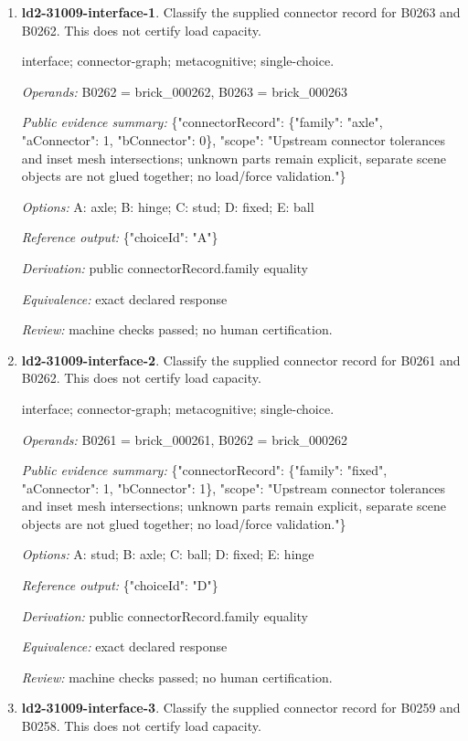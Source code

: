 \begin{enumerate}
\item \textbf{ld2-31009-interface-1}. Classify the supplied connector record for B0263 and B0262. This does not certify load capacity.
\par{\small interface; connector-graph; metacognitive; single-choice.\par\textit{Operands:} B0262 = brick\_000262, B0263 = brick\_000263\par\textit{Public evidence summary:} \{"connectorRecord": \{"family": "axle", "aConnector": 1, "bConnector": 0\}, "scope": "Upstream connector tolerances and inset mesh intersections; unknown parts remain explicit, separate scene objects are not glued together; no load/force validation."\}\par\textit{Options:} A: axle; B: hinge; C: stud; D: fixed; E: ball\par\textit{Reference output:} \{"choiceId": "A"\}\par\textit{Derivation:} public connectorRecord.family equality\par\textit{Equivalence:} exact declared response\par\textit{Review:} machine checks passed; no human certification.}
\item \textbf{ld2-31009-interface-2}. Classify the supplied connector record for B0261 and B0262. This does not certify load capacity.
\par{\small interface; connector-graph; metacognitive; single-choice.\par\textit{Operands:} B0261 = brick\_000261, B0262 = brick\_000262\par\textit{Public evidence summary:} \{"connectorRecord": \{"family": "fixed", "aConnector": 1, "bConnector": 1\}, "scope": "Upstream connector tolerances and inset mesh intersections; unknown parts remain explicit, separate scene objects are not glued together; no load/force validation."\}\par\textit{Options:} A: stud; B: axle; C: ball; D: fixed; E: hinge\par\textit{Reference output:} \{"choiceId": "D"\}\par\textit{Derivation:} public connectorRecord.family equality\par\textit{Equivalence:} exact declared response\par\textit{Review:} machine checks passed; no human certification.}
\item \textbf{ld2-31009-interface-3}. Classify the supplied connector record for B0259 and B0258. This does not certify load capacity.

\end{enumerate}
